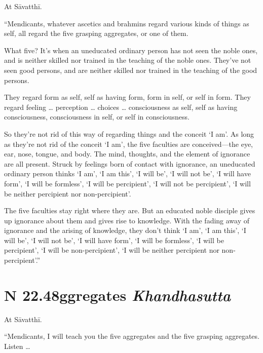 \documentclass[12pt,openany]{book}%
\newcommand*{\suttatitleacronym}[1]{\smaller[2]{#1}\vspace*{.3em}}
\newcommand*{\suttatitletranslation}[1]{\linebreak{#1}}
\newcommand*{\suttatitleroot}[1]{\linebreak\smaller[2]\itshape{#1}}
\newcommand*{\tocacronym}[1]{\hspace*{-3.3em}{#1}\quad}
\newcommand*{\toctranslation}[1]{#1}
\newcommand*{\tocroot}[1]{(\textit{#1})}
\begin{document}
At \textsanskrit{Sāvatthī}. 

“Mendicants, whatever ascetics and brahmins regard various kinds of things as self, all regard the five grasping aggregates, or one of them. 

What five? It’s when an uneducated ordinary person has not seen the noble ones, and is neither skilled nor trained in the teaching of the noble ones. They’ve not seen good persons, and are neither skilled nor trained in the teaching of the good persons. 

They regard form as self, self as having form, form in self, or self in form. They regard feeling … perception … choices … consciousness as self, self as having consciousness, consciousness in self, or self in consciousness. 

So they’re not rid of this way of regarding things and the conceit ‘I am’. As long as they’re not rid of the conceit ‘I am’, the five faculties are conceived—the eye, ear, nose, tongue, and body. The mind, thoughts, and the element of ignorance are all present. Struck by feelings born of contact with ignorance, an uneducated ordinary person thinks ‘I am’, ‘I am this’, ‘I will be’, ‘I will not be’, ‘I will have form’, ‘I will be formless’, ‘I will be percipient’, ‘I will not be percipient’, ‘I will be neither percipient nor non-percipient’. 

The five faculties stay right where they are. But an educated noble disciple gives up ignorance about them and gives rise to knowledge. With the fading away of ignorance and the arising of knowledge, they don’t think ‘I am’, ‘I am this’, ‘I will be’, ‘I will not be’, ‘I will have form’, ‘I will be formless’, ‘I will be percipient’, ‘I will be non-percipient’, ‘I will be neither percipient nor non-percipient’.” 

%
\section*{{\suttatitleacronym SN 22.48}{\suttatitletranslation Aggregates }{\suttatitleroot Khandhasutta}}
\addcontentsline{toc}{section}{\tocacronym{SN 22.48} \toctranslation{Aggregates } \tocroot{Khandhasutta}}

At \textsanskrit{Sāvatthī}. 

“Mendicants, I will teach you the five aggregates and the five grasping aggregates. Listen … 
\end{document}
